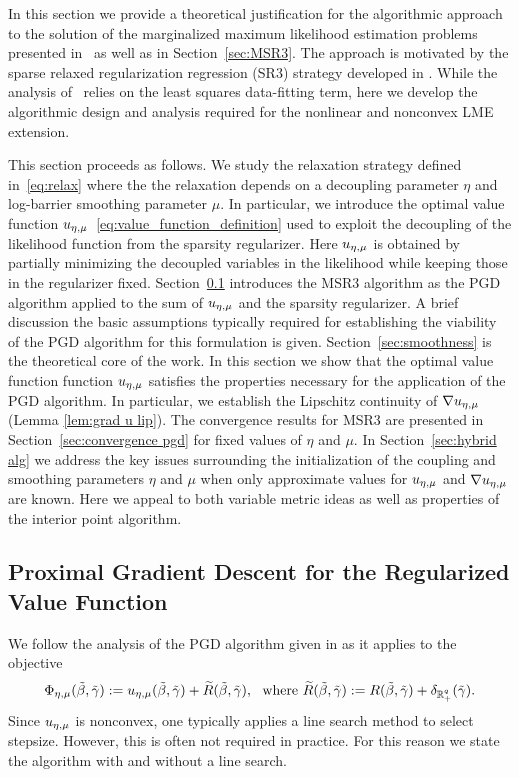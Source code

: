 In this section we provide a 
theoretical justification for the algorithmic approach to the solution
of the marginalized maximum likelihood estimation problems presented
in~\cite{aravkin2022jimtheory} as well as in Section~\ref{sec:MSR3}. The approach is motivated by the sparse relaxed regularization regression (SR3) strategy
developed in \cite{Zheng2019SR3}. While the analysis of~\cite{Zheng2019SR3} relies on the least squares data-fitting term,
here we develop the algorithmic design and analysis required for the nonlinear and nonconvex LME extension.  

This section proceeds as follows. 
We study the relaxation strategy defined in~\eqref{eq:relax} where the the relaxation depends on a decoupling
parameter $\eta$ and log-barrier smoothing parameter $\mu$. In particular, we introduce
the optimal value function ${u_{\eta,\mu}}$~\eqref{eq:value_function_definition} 
used to exploit the decoupling of the likelihood
function from the sparsity regularizer. Here ${u_{\eta,\mu}}$ is obtained by partially minimizing
the decoupled variables in the likelihood while keeping those in the regularizer fixed. 
Section~\ref{sec:pgd} introduces the MSR3 algorithm
as the PGD algorithm 
applied to the sum of ${u_{\eta,\mu}}$ and the sparsity regularizer. 
A brief discussion the basic assumptions typically required
for establishing the viability of the PGD algorithm for this formulation is given.
Section~\ref{sec:smoothness} is the theoretical core of the work. In this section
we show that the optimal value function function ${u_{\eta,\mu}}$ satisfies the properties
necessary for the application of the PGD algorithm. 
In particular, we establish the Lipschitz continuity of $\nabla {u_{\eta,\mu}}$ 
(Lemma \ref{lem:grad u lip}). 
The convergence results for MSR3 are presented in Section~\ref{sec:convergence pgd}
for fixed values of $\eta$ and $\mu$.
In Section~\ref{sec:hybrid alg} we address the key issues surrounding the initialization
of the coupling and smoothing parameters $\eta$ and $\mu$ when only approximate
values for ${u_{\eta,\mu}}$ and $\nabla {u_{\eta,\mu}}$ are known. Here we appeal to both
variable metric ideas as well as properties of the interior point algorithm.


\subsection{Proximal Gradient Descent for the Regularized Value Function} 
\label{sec:pgd}

We follow the analysis of the PGD algorithm given in \cite[Chapter 10]{AB17}
as it applies to the objective
\begin{equation}\label{eq:varphi}
\Phi_\emu\tbg:=\uemu\tbg +\tR\tbg,\ \ \text{where}\ 
\tR\tbg:=R\tbg+\del_{\Rqp}(\tgam).
\end{equation}
%
Since $u_{\eta,\mu}$ is nonconvex, one typically 
applies a line search method to select stepsize. 
However, this is often not required in practice. 
For this reason we state the algorithm with and without a line search.
\medskip

